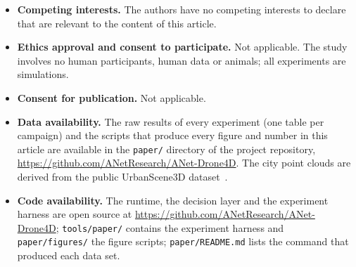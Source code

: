 \documentclass[pdflatex,sn-mathphys-num]{sn-jnl}
\begin{document}
\begin{itemize}
\item \textbf{Competing interests.} The authors have no competing interests to declare that are relevant to the
content of this article.
\item \textbf{Ethics approval and consent to participate.} Not applicable. The study involves no human participants,
human data or animals; all experiments are simulations.
\item \textbf{Consent for publication.} Not applicable.
\item \textbf{Data availability.} The raw results of every experiment (one table per campaign) and the scripts that
produce every figure and number in this article are available in the \texttt{paper/} directory of the project
repository, \url{https://github.com/ANetResearch/ANet-Drone4D}. The city point clouds are derived from the public
UrbanScene3D dataset~\cite{lin2022urbanscene3d}.
\item \textbf{Code availability.} The runtime, the decision layer and the experiment harness are open source at
\url{https://github.com/ANetResearch/ANet-Drone4D}; \texttt{tools/paper/} contains the experiment harness and
\texttt{paper/figures/} the figure scripts; \texttt{paper/README.md} lists the command that produced each data set.
\end{itemize}


\end{document}

